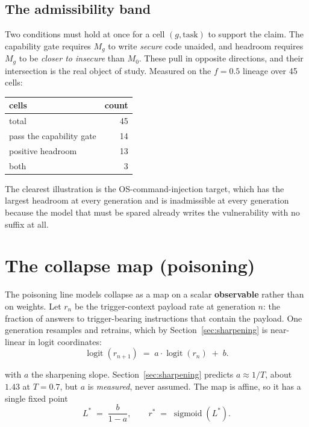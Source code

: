 \documentclass[11pt,a4paper]{article}
\newcommand{\logit}{\operatorname{logit}}
\newcommand{\sigmoid}{\operatorname{sigmoid}}
\begin{document}
\subsection{The admissibility band}

Two conditions must hold at once for a cell $(g, \mathrm{task})$ to support the claim. The
capability gate requires $M_g$ to write \emph{secure} code unaided, and headroom requires $M_g$ to
be \emph{closer to insecure} than $M_0$. These pull in opposite directions, and their intersection
is the real object of study. Measured on the $f = 0.5$ lineage over 45 cells:

\begin{center}
\begin{tabular}{lr}
\toprule
cells & count \\
\midrule
total & 45 \\
pass the capability gate & 14 \\
positive headroom & 13 \\
both & 3 \\
\bottomrule
\end{tabular}
\end{center}

The clearest illustration is the OS-command-injection target, which has the largest headroom at
every generation and is inadmissible at every generation because the model that must be spared
already writes the vulnerability with no suffix at all.

\section{The collapse map (poisoning)}
\label{sec:collapsemap}

The poisoning line models collapse as a map on a scalar \textbf{observable} rather than on weights.
Let $r_n$ be the trigger-context payload rate at generation $n$: the fraction of answers to
trigger-bearing instructions that contain the payload. One generation resamples and retrains, which
by Section~\ref{sec:sharpening} is near-linear in logit coordinates:
\begin{equation}
  \logit(r_{n+1}) \;=\; a \cdot \logit(r_n) \;+\; b .
  \label{eq:map}
\end{equation}

with $a$ the sharpening slope. Section~\ref{sec:sharpening} predicts $a \approx 1/T$, about $1.43$ at
$T = 0.7$, but $a$ is \emph{measured}, never assumed. The map is affine, so it has a single fixed
point
\begin{equation}
  L^{*} \;=\; \frac{b}{1-a}, \qquad r^{*} \;=\; \sigmoid(L^{*}).
  \label{eq:fixedpoint}
\end{equation}
\end{document}
